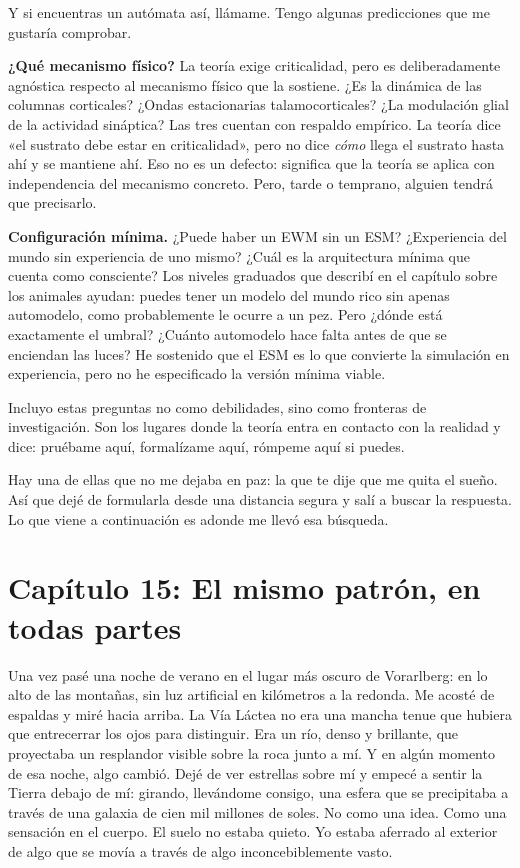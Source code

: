\documentclass[11pt, twoside, openright]{book}
\begin{document}
Y si encuentras un autómata así, llámame. Tengo algunas predicciones que me gustaría comprobar.

\textbf{¿Qué mecanismo físico?} La teoría exige criticalidad, pero es deliberadamente agnóstica respecto al mecanismo físico que la sostiene. ¿Es la dinámica de las columnas corticales? ¿Ondas estacionarias talamocorticales? ¿La modulación glial de la actividad sináptica? Las tres cuentan con respaldo empírico. La teoría dice «el sustrato debe estar en criticalidad», pero no dice \textit{cómo} llega el sustrato hasta ahí y se mantiene ahí. Eso no es un defecto: significa que la teoría se aplica con independencia del mecanismo concreto. Pero, tarde o temprano, alguien tendrá que precisarlo.

\textbf{Configuración mínima.} ¿Puede haber un EWM sin un ESM? ¿Experiencia del mundo sin experiencia de uno mismo? ¿Cuál es la arquitectura mínima que cuenta como consciente? Los niveles graduados que describí en el capítulo sobre los animales ayudan: puedes tener un modelo del mundo rico sin apenas automodelo, como probablemente le ocurre a un pez. Pero ¿dónde está exactamente el umbral? ¿Cuánto automodelo hace falta antes de que se enciendan las luces? He sostenido que el ESM es lo que convierte la simulación en experiencia, pero no he especificado la versión mínima viable.

Incluyo estas preguntas no como debilidades, sino como fronteras de investigación. Son los lugares donde la teoría entra en contacto con la realidad y dice: pruébame aquí, formalízame aquí, rómpeme aquí si puedes.

Hay una de ellas que no me dejaba en paz: la que te dije que me quita el sueño. Así que dejé de formularla desde una distancia segura y salí a buscar la respuesta. Lo que viene a continuación es adonde me llevó esa búsqueda.


\chapter*{Capítulo 15: El mismo patrón, en todas partes}

Una vez pasé una noche de verano en el lugar más oscuro de Vorarlberg: en lo alto de las montañas, sin luz artificial en kilómetros a la redonda. Me acosté de espaldas y miré hacia arriba. La Vía Láctea no era una mancha tenue que hubiera que entrecerrar los ojos para distinguir. Era un río, denso y brillante, que proyectaba un resplandor visible sobre la roca junto a mí. Y en algún momento de esa noche, algo cambió. Dejé de ver estrellas sobre mí y empecé a sentir la Tierra debajo de mí: girando, llevándome consigo, una esfera que se precipitaba a través de una galaxia de cien mil millones de soles. No como una idea. Como una sensación en el cuerpo. El suelo no estaba quieto. Yo estaba aferrado al exterior de algo que se movía a través de algo inconcebiblemente vasto.
\end{document}
